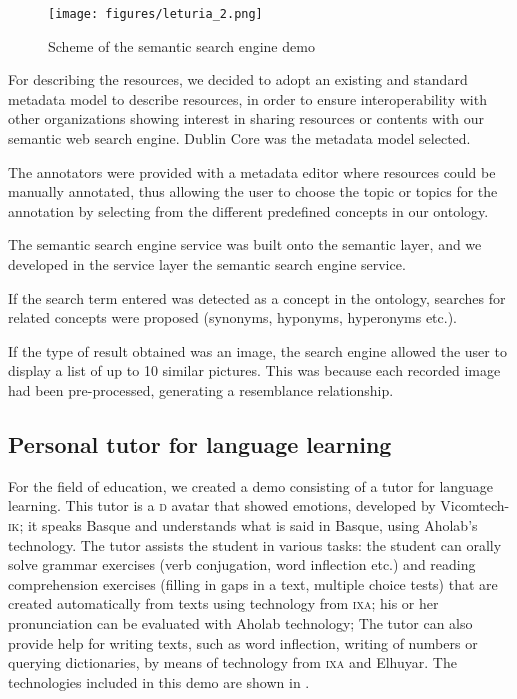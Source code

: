 \documentclass[output=paper]{LSP/langsci}
\begin{document}
\begin{figure}
\texttt{[image: figures/leturia\_2.png]}
\caption{Scheme of the semantic search engine demo}
\label{fig:leturia:2}
\end{figure} 

For describing the resources, we decided to adopt an existing and standard metadata model to describe resources, in order to ensure interoperability with other organizations showing interest in sharing resources or contents with our semantic web search engine. Dublin Core was the metadata model selected.

The annotators were provided with a metadata editor where resources could be manually annotated, thus allowing the user to choose the topic or topics for the annotation by selecting from the different predefined concepts in our ontology.

The semantic search engine service was built onto the semantic layer, and we  developed in the service layer the semantic search engine service.

If the search term entered was detected as a concept in the ontology, searches for related concepts were proposed (synonyms, hyponyms, hyperonyms etc.).

If the type of result obtained was an image, the search engine allowed the user to display a list of up to 10 similar pictures. This was because each recorded image had been pre-processed, generating a resemblance relationship.


\subsection{Personal tutor for language learning}\label{sec:leturia:5.3}

For the field of education, we created a demo consisting of a tutor for language learning. This tutor is a \textsc{d} avatar that showed emotions, developed by Vicomtech-\textsc{ik}; it speaks Basque and understands what is said in Basque, using Aholab's technology. The tutor assists the student in various tasks: the student can orally solve grammar exercises (verb conjugation, word inflection etc.) and reading comprehension exercises (filling in gaps in a text, multiple choice tests) that are created automatically from texts using technology from \textsc{ixa}; his or her pronunciation can be evaluated with Aholab technology; The tutor can also provide help for writing texts, such as word inflection, writing of numbers or querying dictionaries, by means of technology from \textsc{ixa} and Elhuyar. The technologies included in this demo are shown in .
\end{document}
